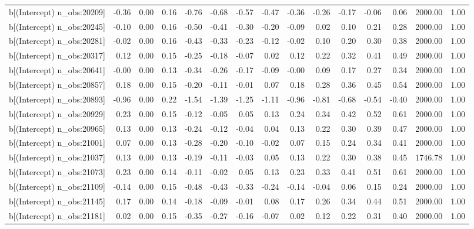 \begin{table}[ht]
\begin{tabular}{rrrrrrrrrrrrrrr}
  b[(Intercept) n\_obs:20209] & -0.36 & 0.00 & 0.16 & -0.76 & -0.68 & -0.57 & -0.47 & -0.36 & -0.26 & -0.17 & -0.06 & 0.06 & 2000.00 & 1.00 \\ 
  b[(Intercept) n\_obs:20245] & -0.10 & 0.00 & 0.16 & -0.50 & -0.41 & -0.30 & -0.20 & -0.09 & 0.02 & 0.10 & 0.21 & 0.28 & 2000.00 & 1.00 \\ 
  b[(Intercept) n\_obs:20281] & -0.02 & 0.00 & 0.16 & -0.43 & -0.33 & -0.23 & -0.12 & -0.02 & 0.10 & 0.20 & 0.30 & 0.38 & 2000.00 & 1.00 \\ 
  b[(Intercept) n\_obs:20317] & 0.12 & 0.00 & 0.15 & -0.25 & -0.18 & -0.07 & 0.02 & 0.12 & 0.22 & 0.32 & 0.41 & 0.49 & 2000.00 & 1.00 \\ 
  b[(Intercept) n\_obs:20641] & -0.00 & 0.00 & 0.13 & -0.34 & -0.26 & -0.17 & -0.09 & -0.00 & 0.09 & 0.17 & 0.27 & 0.34 & 2000.00 & 1.00 \\ 
  b[(Intercept) n\_obs:20857] & 0.18 & 0.00 & 0.15 & -0.20 & -0.11 & -0.01 & 0.07 & 0.18 & 0.28 & 0.36 & 0.45 & 0.54 & 2000.00 & 1.00 \\ 
  b[(Intercept) n\_obs:20893] & -0.96 & 0.00 & 0.22 & -1.54 & -1.39 & -1.25 & -1.11 & -0.96 & -0.81 & -0.68 & -0.54 & -0.40 & 2000.00 & 1.00 \\ 
  b[(Intercept) n\_obs:20929] & 0.23 & 0.00 & 0.15 & -0.12 & -0.05 & 0.05 & 0.13 & 0.24 & 0.34 & 0.42 & 0.52 & 0.61 & 2000.00 & 1.00 \\ 
  b[(Intercept) n\_obs:20965] & 0.13 & 0.00 & 0.13 & -0.24 & -0.12 & -0.04 & 0.04 & 0.13 & 0.22 & 0.30 & 0.39 & 0.47 & 2000.00 & 1.00 \\ 
  b[(Intercept) n\_obs:21001] & 0.07 & 0.00 & 0.13 & -0.28 & -0.20 & -0.10 & -0.02 & 0.07 & 0.15 & 0.24 & 0.34 & 0.41 & 2000.00 & 1.00 \\ 
  b[(Intercept) n\_obs:21037] & 0.13 & 0.00 & 0.13 & -0.19 & -0.11 & -0.03 & 0.05 & 0.13 & 0.22 & 0.30 & 0.38 & 0.45 & 1746.78 & 1.00 \\ 
  b[(Intercept) n\_obs:21073] & 0.23 & 0.00 & 0.14 & -0.11 & -0.02 & 0.05 & 0.13 & 0.23 & 0.33 & 0.41 & 0.51 & 0.61 & 2000.00 & 1.00 \\ 
  b[(Intercept) n\_obs:21109] & -0.14 & 0.00 & 0.15 & -0.48 & -0.43 & -0.33 & -0.24 & -0.14 & -0.04 & 0.06 & 0.15 & 0.24 & 2000.00 & 1.00 \\ 
  b[(Intercept) n\_obs:21145] & 0.17 & 0.00 & 0.14 & -0.18 & -0.09 & -0.01 & 0.08 & 0.17 & 0.26 & 0.34 & 0.44 & 0.51 & 2000.00 & 1.00 \\ 
  b[(Intercept) n\_obs:21181] & 0.02 & 0.00 & 0.15 & -0.35 & -0.27 & -0.16 & -0.07 & 0.02 & 0.12 & 0.22 & 0.31 & 0.40 & 2000.00 & 1.00 \\ 

\end{tabular}
\end{table}
